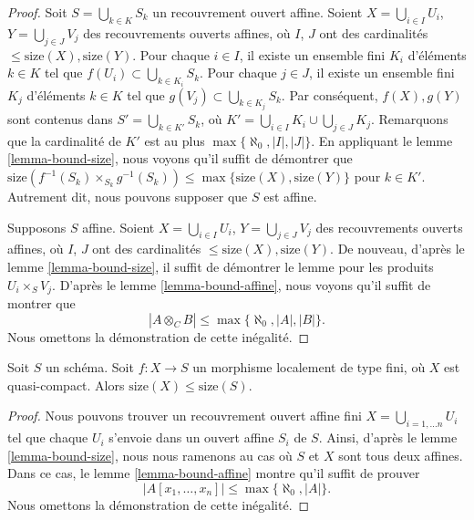 \begin{proof}
Soit $S = \bigcup_{k \in K} S_k$ un recouvrement ouvert affine. Soient
$X = \bigcup_{i \in I} U_i$, $Y = \bigcup_{j \in J} V_j$ des recouvrements
ouverts affines, où $I$, $J$ ont des cardinalités
$\leq \text{size}(X), \text{size}(Y)$. Pour chaque $i \in I$, il existe un
ensemble fini $K_i$ d'éléments $k \in K$ tel que
$f(U_i) \subset \bigcup_{k \in K_i} S_k$. Pour chaque $j \in J$, il existe un
ensemble fini $K_j$ d'éléments $k \in K$ tel que
$g(V_j) \subset \bigcup_{k \in K_j} S_k$. Par conséquent, $f(X), g(Y)$ sont
contenus dans $S' = \bigcup_{k \in K'} S_k$, où
$K' = \bigcup_{i \in I} K_i \cup \bigcup_{j \in J} K_j$. Remarquons que la
cardinalité de $K'$ est au plus
$\max\{\aleph_0, |I|, |J|\}$. En appliquant le lemme
\ref{lemma-bound-size}, nous voyons qu'il suffit de démontrer que
$\text{size}(f^{-1}(S_k) \times_{S_k} g^{-1}(S_k))
\leq \max\{\text{size}(X), \text{size}(Y)\}$ pour $k \in K'$. Autrement dit,
nous pouvons supposer que $S$ est affine.

\medskip\noindent
Supposons $S$ affine. Soient
$X = \bigcup_{i \in I} U_i$, $Y = \bigcup_{j \in J} V_j$ des recouvrements
ouverts affines, où $I$, $J$ ont des cardinalités
$\leq \text{size}(X), \text{size}(Y)$. De nouveau, d'après le lemme
\ref{lemma-bound-size}, il suffit de démontrer le lemme pour les produits
$U_i \times_S V_j$. D'après le lemme \ref{lemma-bound-affine}, nous voyons
qu'il suffit de montrer que
$$
|A \otimes_C B| \leq \max\{\aleph_0, |A|, |B|\}.
$$
Nous omettons la démonstration de cette inégalité.
\end{proof}

\begin{lemma}
\label{lemma-bound-finite-type}
Soit $S$ un schéma. Soit $f : X \to S$ un morphisme localement de type fini,
où $X$ est quasi-compact. Alors
$\text{size}(X) \leq \text{size}(S)$.
\end{lemma}

\begin{proof}
Nous pouvons trouver un recouvrement ouvert affine fini
$X = \bigcup_{i = 1, \ldots n} U_i$ tel que chaque $U_i$ s'envoie dans un
ouvert affine $S_i$ de $S$. Ainsi, d'après le lemme
\ref{lemma-bound-size}, nous nous ramenons au cas où $S$ et $X$ sont tous deux
affines. Dans ce cas, le lemme \ref{lemma-bound-affine} montre qu'il suffit de
prouver
$$
|A[x_1, \ldots, x_n]| \leq \max\{\aleph_0, |A|\}.
$$
Nous omettons la démonstration de cette inégalité.
\end{proof}

